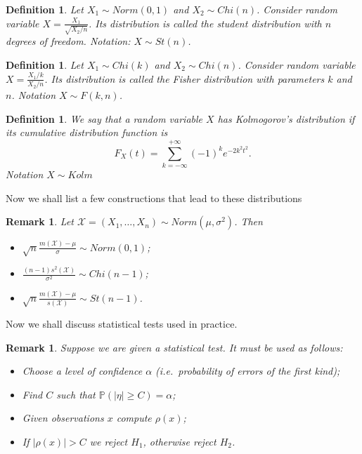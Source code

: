 \documentclass[12pt]{article}
\newtheorem{remark}[theorem]{Remark}
\newtheorem{definition}[theorem]{Definition}
\begin{document}
\begin{definition} Let $X_1\sim Norm(0, 1)$ and $X_2\sim Chi(n)$. Consider
    random variable $X=\frac{X_1}{\sqrt{X_2/n}}$. Its distribution is called the
    student distribution with $n$ degrees of freedom. Notation: $X\sim St(n)$.
\end{definition}

\begin{definition} Let $X_1\sim Chi(k)$ and $X_2\sim Chi(n)$. Consider random
    variable $X=\frac{X_1/k}{X_2/n}$. Its distribution is called the Fisher
    distribution with parameters $k$ and $n$. Notation $X\sim F(k,n)$.
\end{definition}

\begin{definition} We say that a random variable $X$ has Kolmogorov's
    distribution if its cumulative distribution function is
    $$
        F_X(t)=\sum_{k=-\infty}^{+\infty} {(-1)}^k e^{-2k^2t^2}.
    $$
    Notation $X\sim Kolm$
\end{definition}

Now we shall list a few constructions that lead to these distributions

\begin{remark} Let $\mathscr{X}=(X_1,\ldots, X_n)\sim Norm(\mu,\sigma^2)$. Then
    \begin{itemize}
        \item $\sqrt{n}\frac{m(\mathscr{X})-\mu}{\sigma}\sim Norm(0,1)$;
        \item $\frac{(n-1)s^2(\mathscr{X})}{\sigma^2}\sim Chi(n-1)$;
        \item $\sqrt{n}\frac{m(\mathscr{X})-\mu}{s(\mathscr{X})}\sim St(n-1)$.
    \end{itemize}
\end{remark}

Now we shall discuss statistical tests used in practice.

\begin{remark}
    Suppose we are given a statistical test. It must be used as follows:
    \begin{itemize}
        \item Choose a level of confidence $\alpha$ (i.e.\ probability of errors
              of the first kind);
        \item Find $C$ such that $\mathbb{P}(|\eta|\geq C)=\alpha$;
        \item Given observations $x$ compute $\rho(x)$;
        \item If $|\rho(x)|>C$ we reject $H_1$, otherwise reject $H_2$.
    \end{itemize}
\end{remark}
\end{document}
